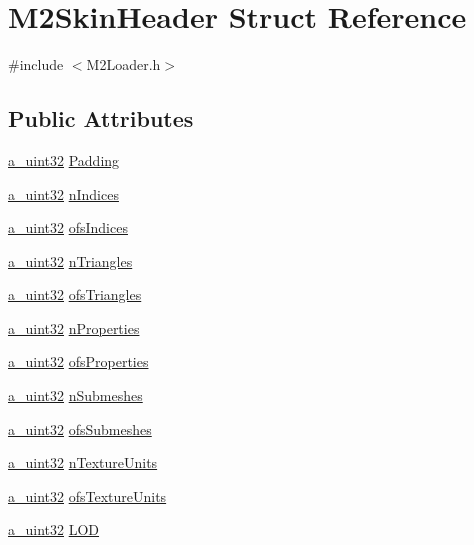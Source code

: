 \hypertarget{struct_m2_skin_header}{\section{M2\+Skin\+Header Struct Reference}
\label{struct_m2_skin_header}
}


{\ttfamily \#include $<$M2\+Loader.\+h$>$}

\subsection*{Public Attributes}
\begin{DoxyCompactItemize}
\item 
\hyperlink{_common_defines_8h_a964296f9770051b9e4807b1f180dd416}{a\+\_\+uint32} \hyperlink{struct_m2_skin_header_a678f172dbc9e440d4ab320eb07709803}{Padding}
\item 
\hyperlink{_common_defines_8h_a964296f9770051b9e4807b1f180dd416}{a\+\_\+uint32} \hyperlink{struct_m2_skin_header_a6d31764f3cb57d0008ec0ea04f463bc9}{n\+Indices}
\item 
\hyperlink{_common_defines_8h_a964296f9770051b9e4807b1f180dd416}{a\+\_\+uint32} \hyperlink{struct_m2_skin_header_a5a0fe3dbea8f73aaf5107bc67b41dfdd}{ofs\+Indices}
\item 
\hyperlink{_common_defines_8h_a964296f9770051b9e4807b1f180dd416}{a\+\_\+uint32} \hyperlink{struct_m2_skin_header_a81a964aa9a16fb63953733166354c4a6}{n\+Triangles}
\item 
\hyperlink{_common_defines_8h_a964296f9770051b9e4807b1f180dd416}{a\+\_\+uint32} \hyperlink{struct_m2_skin_header_a53639c7df755f615f80f8b16110ee422}{ofs\+Triangles}
\item 
\hyperlink{_common_defines_8h_a964296f9770051b9e4807b1f180dd416}{a\+\_\+uint32} \hyperlink{struct_m2_skin_header_a493b1875f93f6760b84b8d186c86033f}{n\+Properties}
\item 
\hyperlink{_common_defines_8h_a964296f9770051b9e4807b1f180dd416}{a\+\_\+uint32} \hyperlink{struct_m2_skin_header_ab54430d99bdeec9da9734671ba0a4c9a}{ofs\+Properties}
\item 
\hyperlink{_common_defines_8h_a964296f9770051b9e4807b1f180dd416}{a\+\_\+uint32} \hyperlink{struct_m2_skin_header_a622be6410428b79434eb5525b694d77d}{n\+Submeshes}
\item 
\hyperlink{_common_defines_8h_a964296f9770051b9e4807b1f180dd416}{a\+\_\+uint32} \hyperlink{struct_m2_skin_header_aec366b83c66bdf0b576212528e7b1b6d}{ofs\+Submeshes}
\item 
\hyperlink{_common_defines_8h_a964296f9770051b9e4807b1f180dd416}{a\+\_\+uint32} \hyperlink{struct_m2_skin_header_a52ea9ef47598fd8c613c1e14f0ba6849}{n\+Texture\+Units}
\item 
\hyperlink{_common_defines_8h_a964296f9770051b9e4807b1f180dd416}{a\+\_\+uint32} \hyperlink{struct_m2_skin_header_ab8eb2fcd6cb88769d70e732fc45558f0}{ofs\+Texture\+Units}
\item 
\hyperlink{_common_defines_8h_a964296f9770051b9e4807b1f180dd416}{a\+\_\+uint32} \hyperlink{struct_m2_skin_header_a67c88bc708b54520574ca4d7a6e0cb50}{L\+O\+D}
\end{DoxyCompactItemize}


